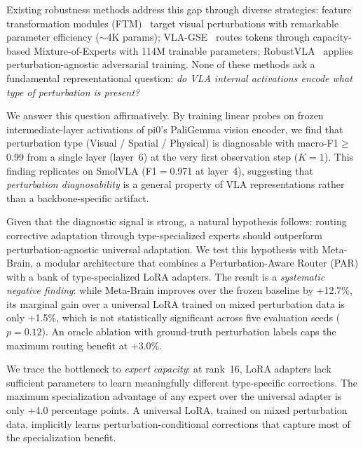 \documentclass[letterpaper]{article}
\newcommand{\ours}{Meta-Brain}
\begin{document}
Existing robustness methods address this gap through diverse strategies: feature transformation modules (FTM)~\cite{zhou2025liberoplus} target visual perturbations with remarkable parameter efficiency ($\sim$4K params); VLA-GSE~\cite{qu2025vlags} routes tokens through capacity-based Mixture-of-Experts with 114M trainable parameters; RobustVLA~\cite{wang2025robustvla} applies perturbation-agnostic adversarial training.
None of these methods ask a fundamental representational question: \emph{do VLA internal activations encode what type of perturbation is present?}

We answer this question affirmatively.
By training linear probes on frozen intermediate-layer activations of pi0's PaliGemma vision encoder, we find that perturbation type (Visual / Spatial / Physical) is diagnosable with macro-F1$\geq$0.99 from a single layer (layer~6) at the very first observation step ($K{=}1$).
This finding replicates on SmolVLA (F1$=$0.971 at layer~4), suggesting that \emph{perturbation diagnosability} is a general property of VLA representations rather than a backbone-specific artifact.

Given that the diagnostic signal is strong, a natural hypothesis follows: routing corrective adaptation through type-specialized experts should outperform perturbation-agnostic universal adaptation.
We test this hypothesis with \ours{}, a modular architecture that combines a Perturbation-Aware Router (PAR) with a bank of type-specialized LoRA adapters.
The result is a \emph{systematic negative finding}: while \ours{} improves over the frozen baseline by +12.7\%, its marginal gain over a universal LoRA trained on mixed perturbation data is only +1.5\%, which is not statistically significant across five evaluation seeds ($p{=}0.12$).
An oracle ablation with ground-truth perturbation labels caps the maximum routing benefit at +3.0\%.

We trace the bottleneck to \emph{expert capacity}: at rank~16, LoRA adapters lack sufficient parameters to learn meaningfully different type-specific corrections.
The maximum specialization advantage of any expert over the universal adapter is only +4.0 percentage points.
A universal LoRA, trained on mixed perturbation data, implicitly learns perturbation-conditional corrections that capture most of the specialization benefit.
\end{document}
